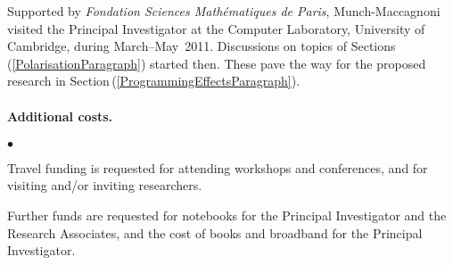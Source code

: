 \documentclass[11pt,twocolumn]{article}
\newenvironment{myitemize}
  {\begin{list}{$\bullet$}
  {\setlength{\topsep}{2pt}
   \setlength{\partopsep}{2pt}
   \setlength{\itemsep}{2.5pt}
   \setlength{\parsep}{2.5pt}
   \setlength{\leftmargin}{1em}
   \setlength{\labelwidth}{.5em}}}
  {\end{list}}
\newcommand{\hidefootnote}[2]{}
\newcommand{\pref}[1]{\,(\ref{#1})}
\newcommand{\Eg}{\emph{Eg.}}
\begin{document}

Supported by \emph{Fondation Sciences Math\'ematiques de Paris},
Munch-Maccagnoni visited the Principal Investigator at the Computer
Laboratory, University of Cambridge, during March--May~2011.  Discussions on
topics of Sections\pref{PolarisationParagraph} started then.  These pave the
way for the proposed research in Section\pref{ProgrammingEffectsParagraph}.


\paragraph*{Additional costs.}

\begin{myitemize}
\item
Travel funding is requested for attending workshops and 
conferences, \hidefootnote{\Eg~CALCO, CIE, CSL, CT, ICALP, ICFP, LICS, MFPS,
  POPL, PPDP, PSSL, RTA, TLCA, TYPES, WOLLIC.}, 
and for visiting and/or inviting researchers. \hidefootnote{\Eg~Aarhus
  (A\,Kock); 
  Bamberg (Mendler);
  Barcelona (J\,Kock);
  Bath (Power); 
  Berkeley (D\,Scott); 
  Birmingham (Escard\'o, Levy); 
  Bologna (Asperti, Dal Lago);
  Buffalo (Lawvere);
  Copenhagen (Birkedal, Filinski); 
  Darmstadt (Streicher); 
  Dublin (Dotsenko);
  Edinburgh (Leinster, Plotkin, A\,Simpson); 
  Genova (Moggi, Rosolini); 
  G\"oteborg (Coquand, Dybjer);
  Gunma (Hamana);
  Ljubljana (Bauer, Pretnar);
  London (Oliva);
  Manchester (Aczel);
  Marseille (Girard, Lafont, Regnier); 
  Montreal (Joyal, Makkai, Panangaden);
  Munich (Abel, Hofmann);
  Nice (C\,Simpson, Vallette);
  Nijmegen (Moerdijk);
  Nottingham (Altenkirch);
  Ottawa (P\,Scott); 
  Oxford (Abramsky, Coecke, Doring); 
  Paris (Burroni, Curien, Herbelin, Krivine, Melli\`es, Metayer);
  Philadelphia (Freyd, Pierce, Weirich);
  Pittsburgh (Avigad, Awodey, Harper, Pfenning, Reynolds);
  Portland (Sheard);
  Princeton (Warren);
  Strathclyde (Ghani, McBride);
  Swansea (Beckmann, Berger);
  Sydney (Garner, Lack, Street);
  Warsaw (Zawadowski).}.
\item
Further funds are requested for notebooks for the Principal Investigator and
the Research Associates, and the cost of books and broadband for the Principal
Investigator.
\end{myitemize}
\end{document}
